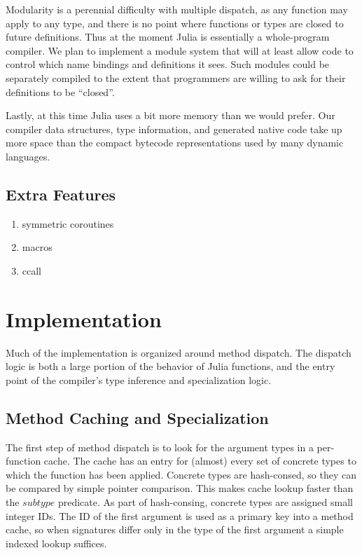 \documentclass[9pt]{sigplanconf}
\begin{document}
Modularity is a perennial difficulty with multiple dispatch, as any
function may apply to any type, and there is no point where functions or
types are closed to future definitions. Thus at the moment Julia is
essentially a whole-program compiler. We plan to implement a module system
that will at least allow code to control which name bindings and definitions
it sees. Such modules could be separately compiled to the extent that
programmers are willing to ask for their definitions to be ``closed''.

Lastly, at this time Julia uses a bit more memory than we would prefer.
Our compiler data structures, type information, and generated native code
take up more space than the compact bytecode representations used by many
dynamic languages.

\subsection{Extra Features}

\begin{enumerate}
\item symmetric coroutines
\item macros
\item ccall
\end{enumerate}

\section{Implementation}

Much of the implementation is organized around method dispatch. The dispatch
logic is both a large portion of the behavior of Julia functions, and the
entry point of the compiler's type inference and specialization logic.

\subsection{Method Caching and Specialization}

The first step of method dispatch is to look for the argument types in a
per-function cache. The cache has an entry for (almost) every set of concrete
types to which the function has been applied. Concrete types are hash-consed,
so they can be compared by simple pointer comparison. This makes cache lookup
faster than the $subtype$ predicate. As part of hash-consing, concrete types
are assigned small integer IDs. The ID of the first argument is used as a
primary key into a method cache, so when signatures differ only in the
type of the first argument a simple indexed lookup suffices.
\end{document}
